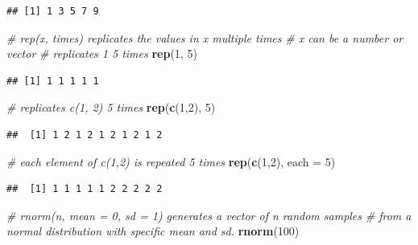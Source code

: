\documentclass[]{book}
\newenvironment{Shaded}{\begin{snugshade}}{\end{snugshade}}
\newcommand{\CommentTok}[1]{\textcolor[rgb]{0.56,0.35,0.01}{\textit{#1}}}
\newcommand{\DataTypeTok}[1]{\textcolor[rgb]{0.13,0.29,0.53}{#1}}
\newcommand{\DecValTok}[1]{\textcolor[rgb]{0.00,0.00,0.81}{#1}}
\newcommand{\KeywordTok}[1]{\textcolor[rgb]{0.13,0.29,0.53}{\textbf{#1}}}
\newcommand{\NormalTok}[1]{#1}
\begin{document}
\begin{verbatim}
## [1] 1 3 5 7 9
\end{verbatim}

\begin{Shaded}
\begin{Highlighting}[]
\CommentTok{# rep(x, times) replicates the values in x multiple times}
\CommentTok{# x can be a number or vector}
\CommentTok{# replicates 1 5 times}
\KeywordTok{rep}\NormalTok{(}\DecValTok{1}\NormalTok{, }\DecValTok{5}\NormalTok{)}
\end{Highlighting}
\end{Shaded}

\begin{verbatim}
## [1] 1 1 1 1 1
\end{verbatim}

\begin{Shaded}
\begin{Highlighting}[]
\CommentTok{# replicates c(1, 2) 5 times}
\KeywordTok{rep}\NormalTok{(}\KeywordTok{c}\NormalTok{(}\DecValTok{1}\NormalTok{,}\DecValTok{2}\NormalTok{), }\DecValTok{5}\NormalTok{)}
\end{Highlighting}
\end{Shaded}

\begin{verbatim}
##  [1] 1 2 1 2 1 2 1 2 1 2
\end{verbatim}

\begin{Shaded}
\begin{Highlighting}[]
\CommentTok{# each element of c(1,2) is repeated 5 times}
\KeywordTok{rep}\NormalTok{(}\KeywordTok{c}\NormalTok{(}\DecValTok{1}\NormalTok{,}\DecValTok{2}\NormalTok{), }\DataTypeTok{each =} \DecValTok{5}\NormalTok{)}
\end{Highlighting}
\end{Shaded}

\begin{verbatim}
##  [1] 1 1 1 1 1 2 2 2 2 2
\end{verbatim}

\begin{Shaded}
\begin{Highlighting}[]
\CommentTok{# rnorm(n, mean = 0, sd = 1) generates a vector of n random samples }
\CommentTok{# from a normal distribution with specific mean and sd. }
\KeywordTok{rnorm}\NormalTok{(}\DecValTok{100}\NormalTok{)}
\end{Highlighting}
\end{Shaded}
\end{document}
